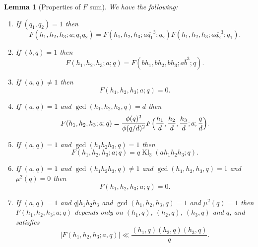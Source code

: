 \documentclass[10pt]{amsart}
\theoremstyle{plain}
\newtheorem{lmm}[thrm]{Lemma}
\numberwithin{equation}{section}
\DeclareMathOperator{\Kl}{Kl}
\begin{document}
\begin{lmm}[Properties of $F$ sum]\label{lmm:FProperties}
We have the following:
\begin{enumerate}
\item If $(q_1,q_2)=1$ then
\[
F(h_1,h_2,h_3;a;q_1q_2)=F(h_1,h_2,h_3;a \overline{q_1}^3;q_2)F(h_1,h_2,h_3;a\overline{q_2}^3;q_1).
\]
\item If $(b,q)=1$ then
\[
F(h_1,h_2,h_3;a;q)=F(b h_1,b h_2,b h_3;a \overline{b}^3;q).
\]
\item If $(a,q)\ne 1$ then 
\[
F(h_1,h_2,h_3;a;q)=0.
\]
\item If $(a,q)=1$ and $\gcd(h_1,h_2,h_3,q)=d$ then 
\[
F(h_1,h_2,h_3; a ;q)=\frac{\phi(q)^2}{\phi(q/d)^2} F\Bigl(\frac{h_1}{d},\frac{h_2}{d},\frac{h_3}{d};a;\frac{q}{d}\Bigr).
\]
\item If $(a,q)=1$ and $\gcd(h_1h_2h_3,q)=1$ then 
\[
F(h_1,h_2,h_3;a;q)=q\Kl_3(ah_1h_2h_3;q).
\]
\item If $(a,q)=1$ and $\gcd(h_1h_2h_3,q)\ne 1$ and $\gcd(h_1,h_2,h_3,q)=1$ and $\mu^2(q)=0$  then 
\[
F(h_1,h_2,h_3;a;q)=0.
\]
\item If $(a,q)=1$ and $q|h_1h_2h_3$ and $\gcd(h_1,h_2,h_3,q)=1$ and $\mu^2(q)=1$ then $F(h_1,h_2,h_3;a;q)$ depends only on $(h_1,q)$, $(h_2,q)$, $(h_3,q)$ and $q$, and satisfies
\[
|F(h_1,h_2,h_3;a,q)|\ll \frac{(h_1,q)(h_2,q)(h_3,q)}{q}.
\]
\end{enumerate}
\end{lmm}
%
%
%
%
\end{document}
